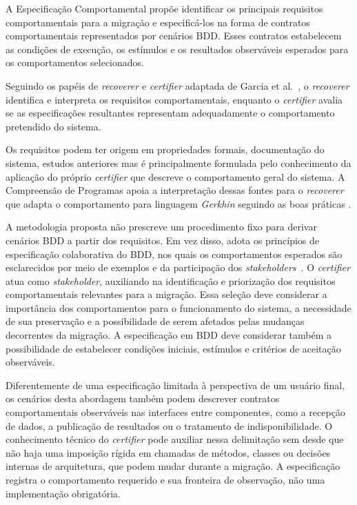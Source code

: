 A Especificação Comportamental propõe identificar os principais requisitos comportamentais para a migração e especificá-los na forma de contratos comportamentais representados por cenários BDD. Esses contratos estabelecem as condições de execução, os estímulos e os resultados observáveis esperados para os comportamentos selecionados.

Seguindo os papéis de \textit{recoverer} e \textit{certifier} adaptada de Garcia et al.~\cite{GarciaKMD12}, o \textit{recoverer} identifica e interpreta os requisitos comportamentais, enquanto o \textit{certifier} avalia se as especificações resultantes representam adequadamente o comportamento pretendido do sistema.

Os requisitos podem ter origem em propriedades formais, documentação do sistema, estudos anteriores mas é principalmente formulada pelo conhecimento da aplicação do próprio \textit{certifier} que descreve o comportamento geral do sistema. A Compreensão de Programas apoia a interpretação dessas fontes para o \textit{recoverer} que adapta o comportamento para linguagem \textit{Gerkhin} seguindo as boas práticas \cite{Binamungu}.

A metodologia proposta não prescreve um procedimento fixo para derivar cenários BDD a partir dos requisitos. Em vez disso, adota os princípios de especificação colaborativa do BDD, nos quais os comportamentos esperados são esclarecidos por meio de exemplos e da participação dos \textit{stakeholders}~\cite{Farooq2023BDD}. O \textit{certifier} atua como \textit{stakeholder}, auxiliando na identificação e priorização dos requisitos comportamentais relevantes para a migração. Essa seleção deve considerar a importância dos comportamentos para o funcionamento do sistema, a necessidade de sua preservação e a possibilidade de serem afetados pelas mudanças decorrentes da migração. A especificação em BDD deve considerar também a possibilidade de estabelecer condições iniciais, estímulos e critérios de aceitação observáveis.

Diferentemente de uma especificação limitada à perspectiva de um usuário final, os cenários desta abordagem também podem descrever contratos comportamentais observáveis nas interfaces entre componentes, como a recepção de dados, a publicação de resultados ou o tratamento de indisponibilidade. O conhecimento técnico do \textit{certifier} pode auxiliar nessa delimitação sem desde que não haja uma imposição rígida em chamadas de métodos, classes ou decisões internas de arquitetura, que podem mudar durante a migração. A especificação registra o comportamento requerido e sua fronteira de observação, não uma implementação obrigatória.


